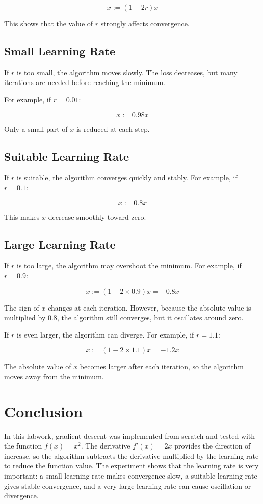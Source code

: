 \documentclass[12pt,a4paper]{article}
\begin{document}
\[
x := (1 - 2r)x
\]

This shows that the value of \(r\) strongly affects convergence.

\subsection{Small Learning Rate}

If \(r\) is too small, the algorithm moves slowly.
The loss decreases, but many iterations are needed before reaching the minimum.

For example, if \(r = 0.01\):

\[
x := 0.98x
\]

Only a small part of \(x\) is reduced at each step.

\subsection{Suitable Learning Rate}

If \(r\) is suitable, the algorithm converges quickly and stably.
For example, if \(r = 0.1\):

\[
x := 0.8x
\]

This makes \(x\) decrease smoothly toward zero.

\subsection{Large Learning Rate}

If \(r\) is too large, the algorithm may overshoot the minimum.
For example, if \(r = 0.9\):

\[
x := (1 - 2 \times 0.9)x = -0.8x
\]

The sign of \(x\) changes at each iteration.
However, because the absolute value is multiplied by \(0.8\), the algorithm still converges, but it oscillates around zero.

If \(r\) is even larger, the algorithm can diverge.
For example, if \(r = 1.1\):

\[
x := (1 - 2 \times 1.1)x = -1.2x
\]

The absolute value of \(x\) becomes larger after each iteration, so the algorithm moves away from the minimum.

\section{Conclusion}

In this labwork, gradient descent was implemented from scratch and tested with the function \(f(x)=x^2\).
The derivative \(f'(x)=2x\) provides the direction of increase, so the algorithm subtracts the derivative multiplied by the learning rate to reduce the function value.
The experiment shows that the learning rate is very important: a small learning rate makes convergence slow, a suitable learning rate gives stable convergence, and a very large learning rate can cause oscillation or divergence.
\end{document}
